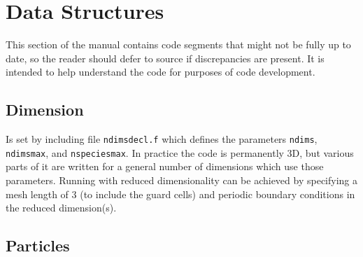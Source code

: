 \documentclass[12pt]{article}
\begin{document}
\section{Data Structures}

This section of the manual contains code segments that might not be
fully up to date, so the reader should defer to source if
discrepancies are present. It is intended to help understand the code
for purposes of code development.

\subsection{Dimension}

Is set by including file \verb!ndimsdecl.f! which defines the
parameters \verb!ndims!, \verb!ndimsmax!, and \verb!nspeciesmax!.  In
practice the code is permanently 3D, but various parts of it are
written for a general number of dimensions which use those
parameters. Running with reduced dimensionality can be achieved by
specifying a mesh length of 3 (to include the guard cells) and
periodic boundary conditions in the reduced dimension(s).


\subsection{Particles}
\end{document}
